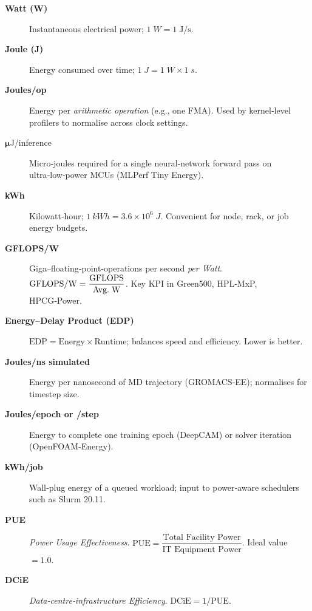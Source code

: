 \begin{description}
\item[\textbf{Watt (W)}] Instantaneous electrical power;
      \(1\;\si{W} = 1\;\si{\joule\per\second}\).

\item[\textbf{Joule (J)}] Energy consumed over time;
      \(1\;\si{J} = 1\;\si{W}\times1\;\si{s}\).

\item[\textbf{Joules/op}] Energy per \emph{arithmetic operation}
      (e.g., one FMA).  Used by kernel‑level profilers to normalise
      across clock settings.

\item[{$\boldsymbol{\mu}$J/inference}] Micro‑joules required for a single
      neural‑network forward pass on ultra‑low‑power MCUs
      (MLPerf Tiny Energy).

\item[\textbf{kWh}] Kilowatt‑hour; \(\SI{1}{kWh}=3.6\times10^{6}\;\si{J}\).
      Convenient for node, rack, or job energy budgets.

\item[\textbf{GFLOPS/W}] Giga–floating‑point‑operations per second
      \emph{per Watt}.  
      \( \text{GFLOPS/W} = \dfrac{\text{GFLOPS}}{\text{Avg.\;W}} \).
      Key KPI in Green500, HPL‑MxP, HPCG‑Power.

\item[\textbf{Energy–Delay Product (EDP)}]
      \( \text{EDP} = \text{Energy}\times\text{Runtime} \); balances
      speed and efficiency.  Lower is better.

\item[\textbf{Joules/ns simulated}] Energy per nanosecond of MD
      trajectory (GROMACS‑EE); normalises for timestep size.

\item[\textbf{Joules/epoch or /step}] Energy to complete one training
      epoch (DeepCAM) or solver iteration (OpenFOAM‑Energy).

\item[\textbf{kWh/job}] Wall‑plug energy of a queued workload; input to
      power‑aware schedulers such as Slurm 20.11.

\item[\textbf{PUE}] \emph{Power Usage Effectiveness}.  
      \(\displaystyle\text{PUE}=
      \dfrac{\text{Total Facility Power}}{\text{IT Equipment Power}}\).
      Ideal value \(=1.0\).

\item[\textbf{DCiE}] \emph{Data‑centre‑infrastructure Efficiency}.
      \( \text{DCiE}=1/\text{PUE} \).


\end{description}
